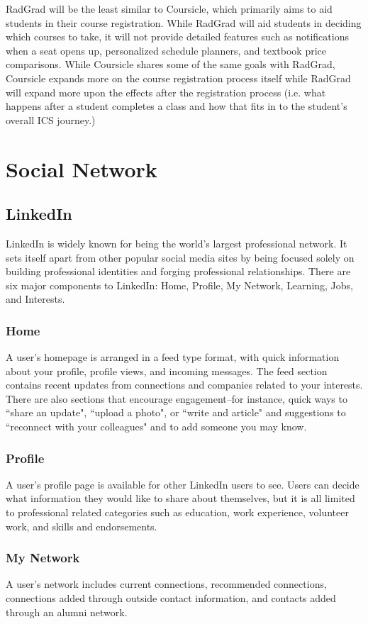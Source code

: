 RadGrad will be the least similar to Coursicle, which primarily aims to aid students in their course registration. While RadGrad will aid students in deciding which courses to take, it will not provide detailed features such as notifications when a seat opens up, personalized schedule planners, and textbook price comparisons. While Coursicle shares some of the same goals with RadGrad, Coursicle expands more on the course registration process itself while RadGrad will expand more upon the effects after the registration process (i.e. what happens after a student completes a class and how that fits in to the student's overall ICS journey.)

\section{Social Network}
\subsection{LinkedIn}
LinkedIn is widely known for being the world's largest professional network. It sets itself apart from other popular social media sites by being focused solely on building professional identities and forging professional relationships. There are six major components to LinkedIn: Home, Profile, My Network, Learning, Jobs, and Interests.
\subsubsection{Home}
A user's homepage is arranged in a feed type format, with quick information about your profile, profile views, and incoming messages. The feed section contains recent updates from connections and companies related to your interests. There are also sections that encourage engagement--for instance, quick ways to ``share an update", ``upload a photo", or ``write and article" and suggestions to ``reconnect with your colleagues" and to add someone you may know. 
\subsubsection{Profile}
A user's profile page is available for other LinkedIn users to see. Users can decide what information they would like to share about themselves, but it is all limited to professional related categories such as education, work experience, volunteer work, and skills and endorsements. 
\subsubsection{My Network}
A user's network includes current connections, recommended connections, connections added through outside contact information, and contacts added through an alumni network. 
